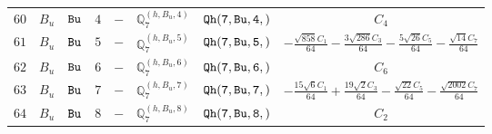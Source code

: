 \documentclass[fleqn,8pt]{jsarticle}
\begin{document}
\begin{table}[ht!]
\begin{center}
\begin{tabular}{cccccccc}
$ 60 $ & $ B_{u} $ & $ {\tt Bu} $ & $ 4 $ & $ - $ & $ \mathbb{Q}_{7}^{(h,B_{u},4)} $ & $ {\tt Qh(7,Bu,4,)} $ & $ C_{4} $ \\
$ 61 $ & $ B_{u} $ & $ {\tt Bu} $ & $ 5 $ & $ - $ & $ \mathbb{Q}_{7}^{(h,B_{u},5)} $ & $ {\tt Qh(7,Bu,5,)} $ & $ - \frac{\sqrt{858} C_{1}}{64} - \frac{3 \sqrt{286} C_{3}}{64} - \frac{5 \sqrt{26} C_{5}}{64} - \frac{\sqrt{14} C_{7}}{64} $ \\
$ 62 $ & $ B_{u} $ & $ {\tt Bu} $ & $ 6 $ & $ - $ & $ \mathbb{Q}_{7}^{(h,B_{u},6)} $ & $ {\tt Qh(7,Bu,6,)} $ & $ C_{6} $ \\
$ 63 $ & $ B_{u} $ & $ {\tt Bu} $ & $ 7 $ & $ - $ & $ \mathbb{Q}_{7}^{(h,B_{u},7)} $ & $ {\tt Qh(7,Bu,7,)} $ & $ - \frac{15 \sqrt{6} C_{1}}{64} + \frac{19 \sqrt{2} C_{3}}{64} - \frac{\sqrt{22} C_{5}}{64} - \frac{\sqrt{2002} C_{7}}{64} $ \\
$ 64 $ & $ B_{u} $ & $ {\tt Bu} $ & $ 8 $ & $ - $ & $ \mathbb{Q}_{7}^{(h,B_{u},8)} $ & $ {\tt Qh(7,Bu,8,)} $ & $ C_{2} $ \\
 \hline \hline
\end{tabular}
\end{center}
\end{table}
\end{document}
